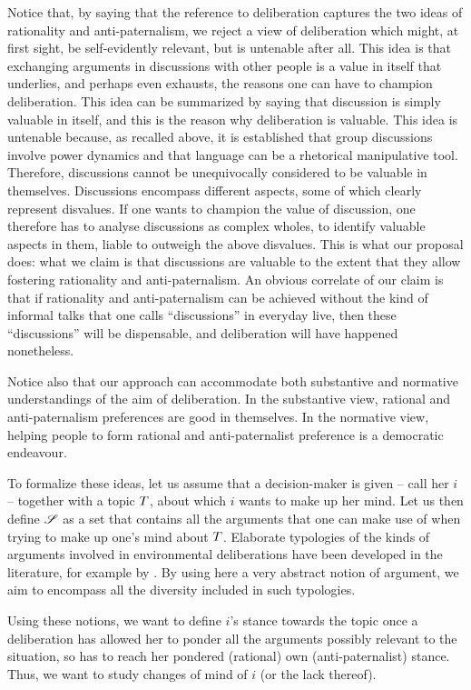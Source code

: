 \documentclass[version=3.21, pagesize, twoside=off, bibliography=totoc, DIV=calc, fontsize=12pt, a4paper, french, english]{scrartcl}
\begin{document}
Notice that, by saying that the reference to deliberation captures the two ideas of rationality and anti-paternalism, we reject a view of deliberation which might, at first sight, be self-evidently relevant, but is untenable after all. This idea is that exchanging arguments in discussions with other people is a value in itself that underlies, and perhaps even exhausts, the reasons one can have to champion deliberation. This idea can be summarized by saying that discussion is simply valuable in itself, and this is the reason why deliberation is valuable. This idea is untenable because, as recalled above, it is established that group discussions involve power dynamics and that language can be a rhetorical manipulative tool. Therefore, discussions cannot be unequivocally considered to be valuable in themselves. Discussions encompass different aspects, some of which clearly represent disvalues. If one wants to champion the value of discussion, one therefore has to analyse discussions as complex wholes, to identify valuable aspects in them, liable to outweigh the above disvalues. This is what our proposal does: what we claim is that discussions are valuable to the extent that they allow fostering rationality and anti-paternalism. An obvious correlate of our claim is that if rationality and anti-paternalism can be achieved without the kind of informal talks that one calls “discussions” in everyday live, then these “discussions” will be dispensable, and deliberation will have happened nonetheless. 

Notice also that our approach can accommodate both substantive and normative understandings of the aim of deliberation. In the substantive view, rational and anti-paternalism preferences are good in themselves. In the normative view, helping people to form rational and anti-paternalist preference is a democratic endeavour.

To formalize these ideas, let us assume that a decision-maker is given -- call her $i$ -- together with a topic $T$, about which $i$ wants to make up her mind. 
Let us then define $\mathscr{S}$ as a set that contains all the arguments that one can make use of when trying to make up one’s mind about $T$.
Elaborate typologies of the kinds of arguments involved in environmental deliberations have been developed in the literature, for example by \citet{chateauraynaud_contrainte_2007}. 
By using here a very abstract notion of argument, we aim to encompass all the diversity included in such typologies. 

Using these notions, we want to define $i$’s stance towards the topic once a deliberation has allowed her to ponder all the arguments possibly relevant to the situation, so has to reach her pondered (rational) own (anti-paternalist) stance. 
Thus, we want to study changes of mind of $i$ (or the lack thereof).
\end{document}
